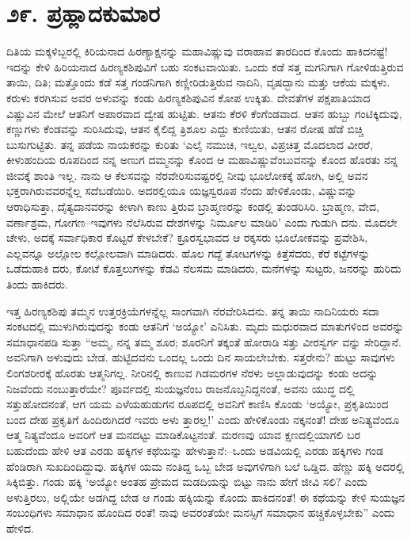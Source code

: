 
\chapter{೨೯. ಪ್ರಹ್ಲಾದಕುಮಾರ}

ದಿತಿಯ ಮಕ್ಕಳಿಬ್ಬರಲ್ಲಿ ಕಿರಿಯನಾದ ಹಿರಣ್ಯಾಕ್ಷನನ್ನು ಮಹಾವಿಷ್ಣುವು ವರಾಹಾವ ತಾರದಿಂದ ಕೊಂದು ಹಾಕಿದನಷ್ಟೆ! ಇದನ್ನು ಕೇಳಿ ಹಿರಿಯನಾದ ಹಿರಣ್ಯಕಶಿಪುವಿಗೆ ಬಹು ಸಂಕಟವಾಯಿತು. ಒಂದು ಕಡೆ ಸತ್ತ ಮಗನಿಗಾಗಿ ಗೋಳಿಡುತ್ತಿರುವ ತಾಯಿ, ದಿತಿ; ಮತ್ತೊಂದು ಕಡೆ ಸತ್ತ ಗಂಡನಿಗಾಗಿ ಕಣ್ಣೀರಿಡುತ್ತಿರುವ ನಾದಿನಿ, ವೃಷದ್ಭಾನು ಮತ್ತು ಆಕೆಯ ಮಕ್ಕಳು. ಕರುಳು ಕರಗಿಸುವ ಅವರ ಅಳುವನ್ನು ಕಂಡು ಹಿರಣ್ಯಕಶಿಪುವಿನ ಕೋಪ ಉಕ್ಕಿತು. ದೇವತೆಗಳ ಪಕ್ಷಪಾತಿಯಾದ ವಿಷ್ಣುವಿನ ಮೇಲೆ ಆತನಿಗೆ ಅಪಾರವಾದ ದ್ವೇಷ ಹುಟ್ಟಿತು. ಆತನು ಕೆರಳಿ ಕೆಂಗೆಂಡವಾದ. ಆತನ ಹುಬ್ಬು ಗಂಟಿಕ್ಕಿದುವು, ಕಣ್ಣುಗಳು ಕೆಂಡವನ್ನು ಸುರಿಸಿದುವು, ಆತನ ಕೈಲಿದ್ದ ತ್ರಿಶೂಲ ಎದ್ದು ಕುಣಿಯಿತು, ಆತನ ರೋಷ ಹೆಡೆ ಬಿಚ್ಚಿ ಬುಸುಗುಟ್ಟಿತು. ತನ್ನ ಪಡೆಯ ನಾಯಕರನ್ನು ಕುರಿತು ‘ಎಲೈ ನಮುಚಿ, ಇಲ್ವಲ, ವಿಪ್ರಚಿತ್ತ ಮೊದಲಾದ ವೀರರೆ, ಕೀಳುಹಂದಿಯ ರೂಪದಿಂದ ನನ್ನ ಅಣುಗ ದಮ್ಮನನ್ನು ಕೊಂದ ಆ ಮಹಾವಿಷ್ಣುವೆಂಬುವನನ್ನು ಕೊಂದ ಹೊರತು ನನ್ನ ಜೀವಕ್ಕೆ ಶಾಂತಿ ಇಲ್ಲ. ನಾನು ಆ ಕೆಲಸವನ್ನು ನೆರವೇರಿಸುವಷ್ಟರಲ್ಲಿ ನೀವು ಭೂಲೋಕಕ್ಕೆ ಹೋಗಿ, ಅಲ್ಲಿ ಅವನ ಭಕ್ತರಾಗಿರುವವರನ್ನೆಲ್ಲ ಸದೆಬಡೆಯಿರಿ. ಅದರಲ್ಲಿಯೂ ಯಜ್ಞಸ್ವರೂಪ ನೆಂದು ಹೇಳಿಕೊಂಡು, ವಿಷ್ಣುವನ್ನು ಆರಾಧಿಸುತ್ತಾ, ದೈತ್ಯದಾನವರನ್ನು ಕೀಳಾಗಿ ಕಾಣು ತ್ತಿರುವ ಬ್ರಾಹ್ಮಣರನ್ನು ಕಂಡಲ್ಲಿ ತುಂಡರಿಸಿರಿ. ಬ್ರಾಹ್ಮಣ, ವೇದ, ವರ್ಣಾಶ್ರಮ, ಗೋಗಣ–ಇವುಗಳು ನೆಲೆಸಿರುವ ದೇಶಗಳನ್ನು ನಿರ್ಮೂಲ ಮಾಡಿರಿ’ ಎಂದು ಗುಡುಗಿ ದನು. ಮೊದಲೇ ಚೇಳು, ಅದಕ್ಕೆ ಸರ್ವಾಧಿಕಾರ ಕೊಟ್ಟರೆ ಕೇಳಬೇಕೆ? ಕ್ರೂರಸ್ವಭಾವದ ಆ ರಕ್ಕಸರು ಭೂಲೋಕವನ್ನು ಪ್ರವೇಶಿಸಿ, ಎಲ್ಲವನ್ನೂ ಅಲ್ಲೋಲ ಕಲ್ಲೋಲವಾಗಿ ಮಾಡಿದರು. ಹೊಲ ಗದ್ದೆ ತೋಟಗಳನ್ನು ಕಿತ್ತೆಸೆದರು, ಕೆರೆ ಕಟ್ಟೆಗಳನ್ನು ಒಡೆದುಹಾಕಿ ದರು, ಕೋಟೆ ಕೊತ್ತಲುಗಳನ್ನು ಕೆಡವಿ ನೆಲಸಮ ಮಾಡಿದರು, ಮನೆಗಳನ್ನು ಸುಟ್ಟರು, ಜನರನ್ನು ಹುರಿದು ತಿಂದು ಹಾಕಿದರು.

ಇತ್ತ ಹಿರಣ್ಯಕಶಿಪು ತಮ್ಮನ ಉತ್ತರಕ್ರಿಯೆಗಳನ್ನೆಲ್ಲ ಸಾಂಗವಾಗಿ ನೆರವೇರಿಸಿದನು. ತನ್ನ ತಾಯಿ ನಾದಿನಿಯರು ಸದಾ ಸಂಕಟದಲ್ಲಿ ಮುಳುಗಿರುವುದನ್ನು ಕಂಡು ಆತನಿಗೆ ‘ಅಯ್ಯೋ’ ಎನಿಸಿತು. ಮೃದು ಮಧುರವಾದ ಮಾತುಗಳಿಂದ ಅವರನ್ನು ಸಮಾಧಾನಪಡಿ ಸುತ್ತಾ “ಅಮ್ಮ, ನನ್ನ ತಮ್ಮ ಶೂರ; ಶೂರನಿಗೆ ತಕ್ಕಂತೆ ಹೋರಾಡಿ ಸತ್ತು ವೀರಸ್ವರ್ಗ ವನ್ನು ಸೇರಿದ್ದಾನೆ. ಅವನಿಗಾಗಿ ಅಳುವುದು ಬೇಡ. ಹುಟ್ಟಿದವನು ಒಂದಲ್ಲ ಒಂದು ದಿನ ಸಾಯಲೇಬೇಕು. ಸತ್ತರೇನು? ಹುಟ್ಟು ಸಾವುಗಳು ಲಿಂಗಶರೀರಕ್ಕೆ ಹೊರತು ಆತ್ಮನಿಗಲ್ಲ. ನೀರಿನಲ್ಲಿ ಕಾಣುವ ಗಿಡಮರಗಳ ನೆರಳು ಅಲ್ಲಾಡುವುದನ್ನು ಕಂಡು ಅದನ್ನು ನಿಜವೆಂದು ನಂಬುತ್ತಾರೆಯೇ? ಪೂರ್ವದಲ್ಲಿ ಸುಯಜ್ಞನೆಂಬ ರಾಜನೊಬ್ಬನಿದ್ದನಂತೆ, ಅವನು ಯುದ್ಧ ದಲ್ಲಿ ಸತ್ತುಹೋದನಂತೆ, ಆಗ ಯಮ ಎಳೆಯಹುಡುಗನ ರೂಪದಲ್ಲಿ ಅವನಿಗೆ ಕಾಣಿಸಿ ಕೊಂಡು ‘ಅಯ್ಯೋ, ಪ್ರಕೃತಿಯಿಂದ ಬಂದ ದೇಹ ಪ್ರಕೃತಿಗೆ ಹಿಂದಿರುಗಿದರೆ ಇವರು ಅಳು ತ್ತಾರಲ್ಲ!’ ಎಂದು ಹೇಳಿಕೊಂಡು ನಕ್ಕನಂತೆ! ದೇಹ ಅನಿತ್ಯವೆಂದೂ ಆತ್ಮ ನಿತ್ಯವೆಂದೂ ಅವರಿಗೆ ಆತ ಮನದಟ್ಟು ಮಾಡಿಕೊಟ್ಟನಂತೆ. ಮರಣವು ಯಾವ ಕ್ಷಣದಲ್ಲಿಯಾಗಲಿ ಬರ ಬಹುದೆಂದು ಹೇಳಿ ಆತ ಎರಡು ಹಕ್ಕಿಗಳ ಕಥೆಯನ್ನು ಹೇಳುತ್ತಾನೆ:–ಒಂದು ಅಡವಿಯಲ್ಲಿ ಎರಡು ಹಕ್ಕಿಗಳು ಗಂಡ ಹೆಂಡಿರಾಗಿ ಸುಖದಿಂದಿದ್ದುವು. ಹಕ್ಕಿಗಳ ಯಮ ನಂತಿದ್ದ ಒಬ್ಬ ಬೇಡ ಅವುಗಳಿಗಾಗಿ ಬಲೆ ಒಡ್ಡಿದ. ಹೆಣ್ಣು ಹಕ್ಕಿ ಅದರಲ್ಲಿ ಸಿಕ್ಕಿಬಿತ್ತು. ಗಂಡು ಹಕ್ಕಿ ‘ಅಯ್ಯೋ ಅಂತಹ ಪ್ರೇಮದ ಮಡದಿಯನ್ನು ಬಿಟ್ಟು ನಾನು ಹೇಗೆ ಜೀವಿ ಸಲಿ? ಎಂದು ಅಳುತ್ತಿರಲು, ಅಲ್ಲಿಯೇ ಅಡಗಿದ್ದ ಬೇಡ ಆ ಗಂಡು ಹಕ್ಕಿಯನ್ನು ಕೊಂದು ಹಾಕಿದನಂತೆ! ಈ ಕಥೆಯನ್ನು ಕೇಳಿ ಸುಯಜ್ಞನ ಸಂಬಂಧಿಗಳು ಸಮಾಧಾನ ಹೊಂದಿದ ರಂತೆ! ನಾವು ಅವರಂತೆಯೇ ಮನಸ್ಸಿಗೆ ಸಮಾಧಾನ ಹಚ್ಚಿಕೊಳ್ಳಬೇಕು” ಎಂದು ಹೇಳಿದ.

